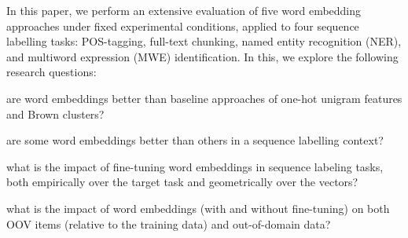 

In this paper, we perform an extensive evaluation of five word embedding
approaches under fixed experimental conditions, applied to four sequence
labelling tasks: POS-tagging, full-text chunking, named entity
recognition (NER), and multiword expression (MWE) identification. In
this, we explore the following research questions:
\begin{compactenum}[\bf RQ1:]
\item are word embeddings better than baseline approaches of one-hot
  unigram features and Brown clusters?
\item are some word embeddings better than others in a sequence
  labelling context?
\item what is the impact of fine-tuning word embeddings in sequence
  labeling tasks, both empirically over the target task and
  geometrically over the vectors?
\item what is the impact of word embeddings (with and without
  fine-tuning) on both OOV items (relative to the training data) and
  out-of-domain data?
\end{compactenum}





